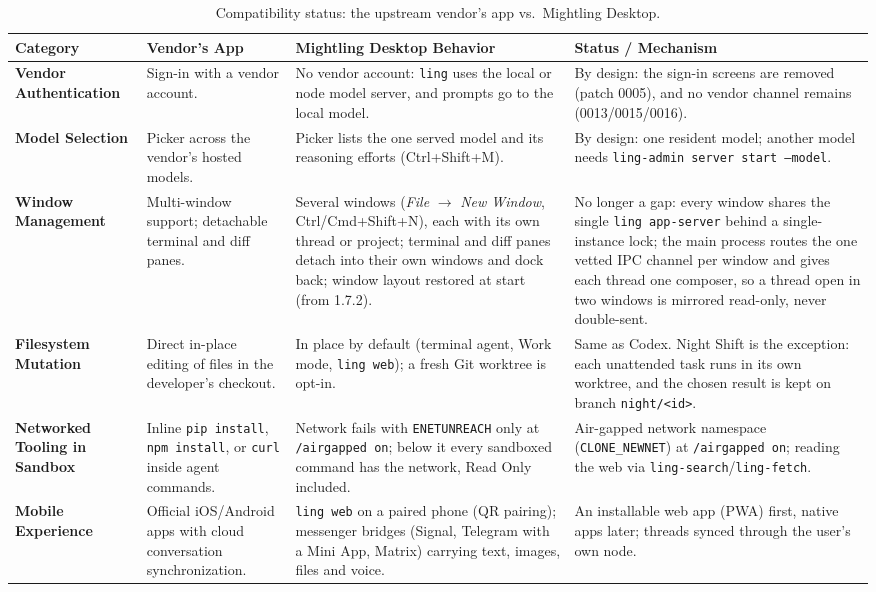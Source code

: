 \documentclass[11pt]{article}
\newcommand{\code}[1]{\texttt{#1}}
\newcommand{\agon}{\code{/airgapped on}}
\begin{document}
\begin{table}[t]
\centering
\small
\caption{Compatibility status: the upstream vendor's app vs.\ Mightling Desktop.}
\label{tab:user-friction-matrix}
\begin{tabularx}{\textwidth}{>{\raggedright\arraybackslash}p{2.9cm} >{\raggedright\arraybackslash}X >{\raggedright\arraybackslash}X >{\raggedright\arraybackslash}X}
\toprule
\textbf{Category} & \textbf{Vendor's App} & \textbf{Mightling Desktop Behavior} & \textbf{Status / Mechanism} \\
\midrule
\textbf{Vendor Authentication} & Sign-in with a vendor account. & No vendor account: \code{ling} uses the local or node model server, and prompts go to the local model. & By design: the sign-in screens are removed (patch 0005), and no vendor channel remains (0013/0015/0016). \\
\midrule
\textbf{Model Selection} & Picker across the vendor's hosted models. & Picker lists the one served model and its reasoning efforts (Ctrl+Shift+M). & By design: one resident model; another model needs \code{ling-admin}\allowbreak\ \code{server start --model}. \\
\midrule
\textbf{Window Management} & Multi-window support; detachable terminal and diff panes. & Several windows (\textit{File} $\rightarrow$ \textit{New Window}, Ctrl/Cmd+Shift+N), each with its own thread or project; terminal and diff panes detach into their own windows and dock back; window layout restored at start (from 1.7.2). & No longer a gap: every window shares the single \code{ling}\allowbreak\ \code{app-server} behind a single-instance lock; the main process routes the one vetted IPC channel per window and gives each thread one composer, so a thread open in two windows is mirrored read-only, never double-sent. \\
\midrule
\textbf{Filesystem Mutation} & Direct in-place editing of files in the developer's checkout. & In place by default (terminal agent, Work mode, \code{ling web}); a fresh Git worktree is opt-in. & Same as Codex. Night Shift is the exception: each unattended task runs in its own worktree, and the chosen result is kept on branch \code{night/<id>}. \\
\midrule
\textbf{Networked Tooling in Sandbox} & Inline \code{pip install}, \code{npm install}, or \code{curl} inside agent commands. & Network fails with \code{ENETUNREACH} only at \agon; below it every sandboxed command has the network, Read Only included. & Air-gapped network namespace (\code{CLONE\_NEWNET}) at \agon; reading the web via \code{ling-search}/\code{ling-fetch}. \\
\midrule
\textbf{Mobile Experience} & Official iOS/Android apps with cloud conversation synchronization. & \code{ling web} on a paired phone (QR pairing); messenger bridges (Signal, Telegram with a Mini App, Matrix) carrying text, images, files and voice. & An installable web app (PWA) first, native apps later; threads synced through the user's own node. \\
\bottomrule
\end{tabularx}
\end{table}
\end{document}
